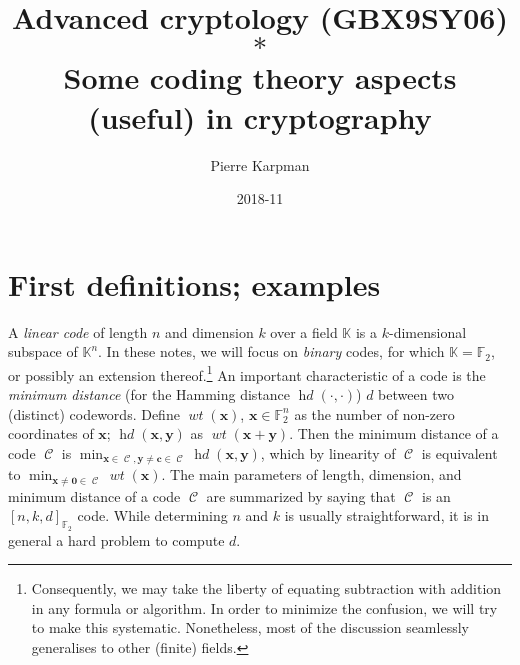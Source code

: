 \documentclass[11pt,a4paper]{article}
\title{Advanced cryptology (GBX9SY06)\\
$\ast$\\
Some coding theory aspects (useful) in cryptography}
\date{2018-11}
\author{Pierre Karpman}
\theoremstyle{definition}
\DeclareMathOperator\code{\mathcal{C}}
\DeclareMathOperator\hd{\mathit{hd}}
\DeclareMathOperator\wt{\mathit{wt}}
\newcommand\ftwo{\mathbb{F}_{2}}
\begin{document}
\maketitle{}

\section{First definitions; examples}

A \emph{linear code} of length $n$ and dimension $k$ over a field $\mathbb{K}$ is a $k$-dimensional subspace of $\mathbb{K}^n$. In these notes, we will focus on \emph{binary} codes, for which $\mathbb{K} = \mathbb{F}_2$, or possibly an extension thereof.\footnote{Consequently, we may take the liberty of
equating subtraction with addition in any formula or algorithm. In order to minimize the confusion, we will try to make this systematic. Nonetheless, most of the discussion seamlessly generalises to other (finite) fields.}
An important characteristic of a code is the \emph{minimum distance} (for the Hamming distance $\hd(\cdot,\cdot)$) $d$ between two (distinct) codewords. Define $\wt(\bm{x})$, $\bm{x} \in \ftwo^n$ as the number of
non-zero coordinates of $\bm{x}$; $\hd(\bm{x},\bm{y})$ as $\wt(\bm{x}+\bm{y})$. Then the minimum distance of a code $\code$ is $\min_{\bm{x}\in\code,\bm{y}\neq\bm{c}\in\code} \hd(\bm{x},\bm{y})$, which by linearity of $\code$ is equivalent
to $\min_{\bm{x}\neq\bm{0}\in\code} \wt(\bm{x})$. The main parameters of length, dimension, and minimum distance of a code $\code$ are summarized by saying that $\code$ is an $[n,k,d]_{\ftwo}$ code. While determining $n$ and $k$ is usually straightforward,
it is in general a hard problem to compute $d$.

\smallskip
\end{document}
